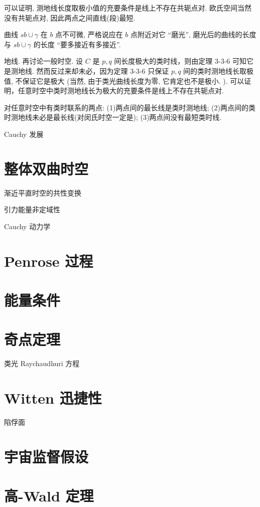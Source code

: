 可以证明, 测地线长度取极小值的充要条件是线上不存在共轭点对. 欧氏空间当然没有共轭点对, 因此两点之间直线(段)最短.


曲线 $s b \cup \gamma$ 在 $b$ 点不可微, 严格说应在 $b$ 点附近对它 “磨光”, 磨光后的曲线的长度与 $s b \cup \gamma$ 的长度 “要多接近有多接近”.



地线. 再讨论一般时空. 设 $C$ 是 $p, q$ 间长度极大的类时线，则由定理 3-3-6 可知它是测地线. 然而反过来却未必，因为定理 3-3-6 只保证 $p, q$ 间的类时测地线长取极值, 不保证它是极大 (当然, 由于类光曲线长度为零, 它肯定也不是极小. ). 可以证明，任意时空中类时测地线长为极大的充要条件是线上不存在共轭点对. 


 对任意时空中有类时联系的两点: (1)两点间的最长线是类时测地线; (2)两点间的类时测地线未必是最长线(对闵氏时空一定是); (3)两点间没有最短类时线.


Cauchy 发展

\section{整体双曲时空}

渐近平直时空的共性变换

引力能量非定域性

Cauchy 动力学


\section{Penrose 过程}

\section{能量条件}
\section{奇点定理}


类光 Raychaudhuri 方程
\section{Witten 迅捷性}
陷俘面
\section{宇宙监督假设}
\section{高-Wald 定理}



